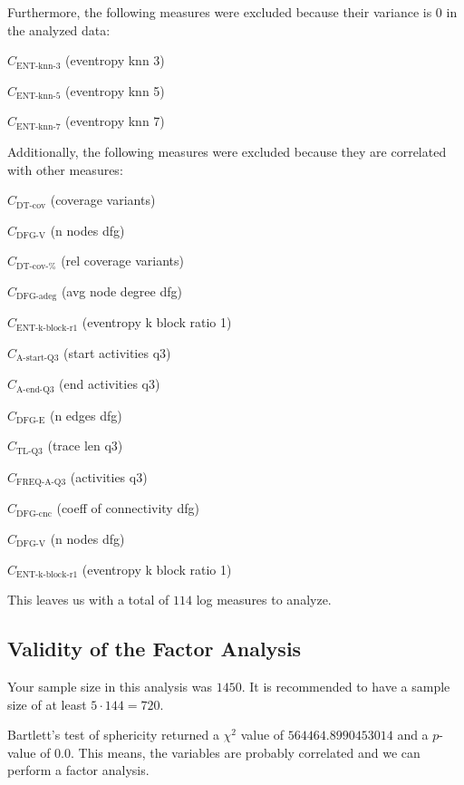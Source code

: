 \documentclass[a4paper]{article}
\newcommand{\startqthreename}{\text{A-start-Q3}}
\newcommand{\startqthree}{C_{\startqthreename}}
\newcommand{\lastqthreename}{\text{A-end-Q3}}
\newcommand{\lastqthree}{C_{\lastqthreename}}
\newcommand{\tlqthreename}{\text{TL-Q3}}
\newcommand{\tlqthree}{C_{\tlqthreename}}
\newcommand{\actfreqqthreename}{\text{FREQ-A-Q3}}
\newcommand{\actfreqqthree}{C_{\actfreqqthreename}}
\newcommand{\dtcovname}{\text{DT-cov}}
\newcommand{\dtcov}{C_{\dtcovname}}
\newcommand{\dtrelcovname}{\text{DT-cov-\%}}
\newcommand{\dtrelcov}{C_{\dtrelcovname}}
\newcommand{\dfgnodesname}{\text{DFG-V}}
\newcommand{\dfgnodes}{C_{\dfgnodesname}}
\newcommand{\dfgedgesname}{\text{DFG-E}}
\newcommand{\dfgedges}{C_{\dfgedgesname}}
\newcommand{\dfgcncname}{\text{DFG-cnc}}
\newcommand{\dfgcnc}{C_{\dfgcncname}}
\newcommand{\dfgavgdegname}{\text{DFG-adeg}}
\newcommand{\dfgavgdeg}{C_{\dfgavgdegname}}
\newcommand{\entkblockronename}{\text{ENT-k-block-r1}}
\newcommand{\entkblockrone}{C_{\entkblockronename}}
\newcommand{\entknnthreename}{\text{ENT-knn-3}}
\newcommand{\entknnthree}{C_{\entknnthreename}}
\newcommand{\entknnfivename}{\text{ENT-knn-5}}
\newcommand{\entknnfive}{C_{\entknnfivename}}
\newcommand{\entknnsevenname}{\text{ENT-knn-7}}
\newcommand{\entknnseven}{C_{\entknnsevenname}}
\begin{document}
\bigskip
\noindent
Furthermore, the following measures were excluded because their variance is $0$ in the analyzed data:
\begin{compactenum}
\item $\entknnthree$ (eventropy knn 3)
\item $\entknnfive$ (eventropy knn 5)
\item $\entknnseven$ (eventropy knn 7)
\end{compactenum}

\bigskip
\noindent
Additionally, the following measures were excluded because they are correlated with other measures:
\begin{compactenum}
\item $\dtcov$ (coverage variants)
\item $\dfgnodes$ (n nodes dfg)
\item $\dtrelcov$ (rel coverage variants)
\item $\dfgavgdeg$ (avg node degree dfg)
\item $\entkblockrone$ (eventropy k block ratio 1)
\item $\startqthree$ (start activities q3)
\item $\lastqthree$ (end activities q3)
\item $\dfgedges$ (n edges dfg)
\item $\tlqthree$ (trace len q3)
\item $\actfreqqthree$ (activities q3)
\item $\dfgcnc$ (coeff of connectivity dfg)
\item $\dfgnodes$ (n nodes dfg)
\item $\entkblockrone$ (eventropy k block ratio 1)
\end{compactenum}

\bigskip
\noindent
This leaves us with a total of $114$ log measures to analyze.

\subsection*{Validity of the Factor Analysis}
Your sample size in this analysis was $1450$.
It is recommended to have a sample size of at least $5 \cdot 144 = 720$.

\noindent 
Bartlett's test of sphericity returned a $\chi^2$ value of $564464.8990453014$ and a $p$-value of $0.0$.
This means, the variables are probably correlated and we can perform a factor analysis.
\end{document}
